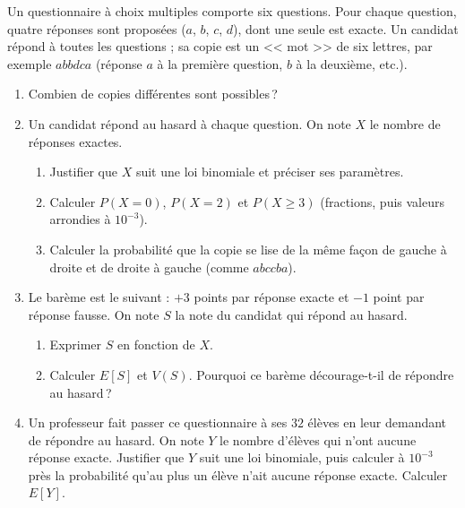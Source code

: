 \begin{exo}\label{exo:proba-21}
Un questionnaire \`a choix multiples comporte six questions.
Pour chaque question, quatre r\'eponses sont propos\'ees ($a$, $b$, $c$, $d$), dont une seule est exacte.
Un candidat r\'epond \`a toutes les questions ; sa copie est un << mot >> de six lettres,
par exemple $abbdca$ (r\'eponse $a$ \`a la premi\`ere question, $b$ \`a la deuxi\`eme, etc.).
\begin{enumerate}
\item Combien de copies diff\'erentes sont possibles\,?
\item Un candidat r\'epond au hasard \`a chaque question. On note $X$ le nombre de r\'eponses exactes.
      \begin{enumerate}
      \item Justifier que $X$ suit une loi binomiale et pr\'eciser ses param\`etres.
      \item Calculer $P(X = 0)$, $P(X = 2)$ et $P(X \geq 3)$ (fractions, puis valeurs arrondies \`a $10^{-3}$).
      \item Calculer la probabilit\'e que la copie se lise de la m\^eme fa\c{c}on de gauche \`a droite et de droite \`a gauche
            (comme $abccba$).
      \end{enumerate}
\item Le bar\`eme est le suivant : $+3$ points par r\'eponse exacte et $-1$ point par r\'eponse fausse.
      On note $S$ la note du candidat qui r\'epond au hasard.
      \begin{enumerate}
      \item Exprimer $S$ en fonction de $X$.
      \item Calculer $E[S]$ et $V(S)$. Pourquoi ce bar\`eme d\'ecourage-t-il de r\'epondre au hasard\,?
      \end{enumerate}
\item Un professeur fait passer ce questionnaire \`a ses $32$ \'el\`eves en leur demandant de r\'epondre au hasard.
      On note $Y$ le nombre d'\'el\`eves qui n'ont aucune r\'eponse exacte.
      Justifier que $Y$ suit une loi binomiale, puis calculer \`a $10^{-3}$ pr\`es la probabilit\'e
      qu'au plus un \'el\`eve n'ait aucune r\'eponse exacte. Calculer $E[Y]$.
\end{enumerate}
\end{exo}
%

